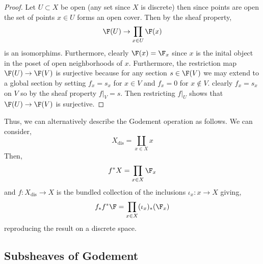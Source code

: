 \documentclass[12pt]{article}
\begin{document}
\begin{proof}
Let $U \subset X$ be open (any set since $X$ is discrete) then since points are open the set of points $x \in U$ forms an open cover. Then by the sheaf property,
\[ \F(U) \to \prod_{x \in U} \F(x) \]
is an isomorphims. Furthermore, clearly $\F(x) = \F_x$ since $x$ is the inital object in the poset of open neighborhoods of $x$. Furthermore, the restriction map $\F(U) \to \F(V)$ is surjective because for any section $s \in \F(V)$ we may extend to a global section by setting $f_x = s_x$ for $x \in V$ and $f_x = 0$ for $x \notin V$. clearly $f_x = s_x$ on $V$ so by the sheaf property $f|_V = s$. Then restricting $f|_U$ shows that $\F(U) \to \F(V)$ is surjective.
\end{proof}
\noindent
Thus, we can alternatively describe the Godement operation as follows. We can consider,
\[ X_{\text{dis}} = \coprod_{x \in X} x \]
Then,
\[ f^* X = \prod_{x \in X} \F_x \]
and $f : X_{\text{dis}} \to X$ is the bundled collection of the inclusions $\iota_x : x \to X$ giving,
\[ f_* f^* \F = \prod_{x \in X} (\iota_x)_* (\F_x) \]
reproducing the result on a discrete space.

\subsection{Subsheaves of Godement}
\end{document}
